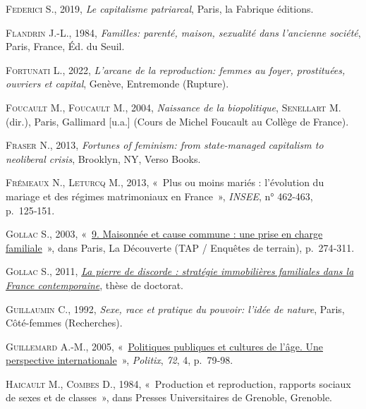 \documentclass[
  12pt,
]{book}
\newlength{\cslhangindent}
\newenvironment{CSLReferences}[2] %
 {\begin{list}{}{%
  \setlength{\itemindent}{0pt}
  \setlength{\leftmargin}{0pt}
  \setlength{\parsep}{0pt}
  \ifodd #1
   \setlength{\leftmargin}{\cslhangindent}
   \setlength{\itemindent}{-1\cslhangindent}
  \fi
  \setlength{\itemsep}{#2\baselineskip}}}
 {\end{list}}
\begin{document}
\begin{CSLReferences}{0}{1}
\textsc{Federici S.}, 2019, \emph{Le capitalisme patriarcal}, Paris, la
Fabrique éditions.

\textsc{Flandrin J.-L.}, 1984, \emph{Familles: parenté, maison,
sexualité dans l'ancienne société}, Paris, France, Éd. du Seuil.

\textsc{Fortunati L.}, 2022, \emph{L'arcane de la reproduction: femmes
au foyer, prostituées, ouvriers et capital}, Genève, Entremonde
(Rupture).

\textsc{Foucault M.}, \textsc{Foucault M.}, 2004, \emph{Naissance de la
biopolitique}, \textsc{Senellart M.} (dir.), Paris, Gallimard {[}u.a.{]}
(Cours de Michel Foucault au Collège de France).

\textsc{Fraser N.}, 2013, \emph{Fortunes of feminism: from state-managed
capitalism to neoliberal crisis}, Brooklyn, NY, Verso Books.

\textsc{Frémeaux N.}, \textsc{Leturcq M.}, 2013, {«~Plus ou moins mariés
: l{'}évolution du mariage et des régimes matrimoniaux en France~»},
\emph{INSEE}, n° 462-463, p.~125‑151.

\textsc{Gollac S.}, 2003,
{«~\href{https://www.cairn.info/charges-de-famille--9782707141347-p-274.htm}{9.
Maisonnée et cause commune : une prise en charge familiale}~»}, dans
Paris, La Découverte (TAP / Enquêtes de terrain), p.~274‑311.

\textsc{Gollac S.}, 2011, \emph{\href{https://theses.fr/2011EHES0045}{La
pierre de discorde : stratégie immobilières familiales dans la France
contemporaine}}, thèse de doctorat.

\textsc{Guillaumin C.}, 1992, \emph{Sexe, race et pratique du pouvoir:
l'idée de nature}, Paris, Côté-femmes (Recherches).

\textsc{Guillemard A.-M.}, 2005,
{«~\href{https://doi.org/10.3917/pox.072.0079}{Politiques publiques et
cultures de l'âge. Une perspective internationale}~»}, \emph{Politix},
\emph{72}, 4, p.~79‑98.

\textsc{Haicault M.}, \textsc{Combes D.}, 1984, {«~Production et
reproduction, rapports sociaux de sexes et de classes~»}, dans Presses
Universitaires de Grenoble, Grenoble.


\end{CSLReferences}
\end{document}
